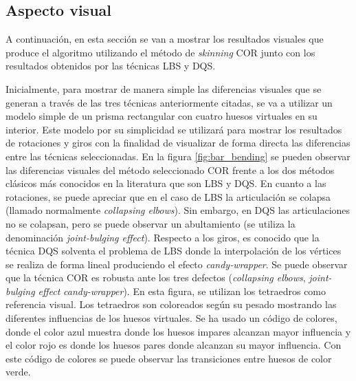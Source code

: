 \subsection{Aspecto visual} 
A continuación, en esta sección se van a mostrar los resultados visuales que produce el algoritmo utilizando el método de \emph{skinning} \ac{COR} junto con los resultados obtenidos por las técnicas \ac{LBS} y \ac{DQS}.


Inicialmente, para mostrar de manera simple las diferencias visuales que se generan a través de las tres técnicas anteriormente citadas, se va a utilizar un modelo simple de un prisma rectangular con cuatro huesos virtuales en su interior. Este modelo por su simplicidad se utilizará para mostrar los resultados de rotaciones y giros con la finalidad de visualizar de forma directa las diferencias entre las técnicas seleccionadas. En la figura \ref{fig:bar_bending} se pueden observar las diferencias visuales del método seleccionado \ac{COR} frente a los dos métodos clásicos más conocidos en la literatura que son \ac{LBS} y \ac{DQS}. En cuanto a las rotaciones, se puede apreciar que en el caso de \ac{LBS} la articulación se colapsa (llamado normalmente \emph{collapsing elbows}). Sin embargo, en \ac{DQS} las articulaciones no se colapsan, pero se puede observar un abultamiento (se utiliza la denominación \emph{joint-bulging effect}). Respecto a los giros, es conocido que la técnica \ac{DQS} solventa el problema de \ac{LBS} donde la interpolación de los vértices se realiza de forma lineal produciendo el efecto \emph{candy-wrapper}. Se puede observar que la técnica \ac{COR} es robusta ante los tres defectos (\emph{collapsing elbows}, \emph{joint-bulging effect} \emph{candy-wrapper}). 
En esta figura, se utilizan los tetraedros como referencia visual. Los tetraedros son coloreados según su pesado mostrando las diferentes influencias de los huesos virtuales. Se ha usado un código de colores, donde el color azul muestra donde los huesos impares alcanzan mayor influencia y el color rojo es donde los huesos pares donde alcanzan su mayor influencia. Con este código de colores se puede observar las transiciones entre huesos de color verde.

